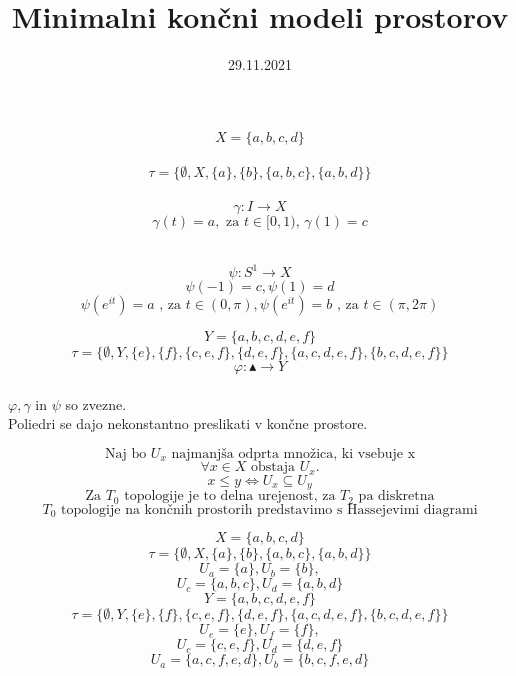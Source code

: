 \documentclass[70]{beamer}
\begin{document}
\title{Minimalni končni modeli prostorov}
\date{29.11.2021}

\begin{frame}
   \titlepage
\end{frame}

\begin{frame}
    $$X = \{a,b,c,d\}$$\\
    $$\tau = \{\emptyset, X, \{a\}, \{b\}, \{a,b,c\}, \{a,b,d\}\}$$ \\ \pause
    $$\gamma : I \rightarrow X$$
    $$  \gamma  (t)  = a, \text{ za }t \in [0,1)\text{, }  \gamma  (1) = c$$\\
    \pause

    $$\psi: S^1 \rightarrow X$$
    $$\psi(-1) = c, \psi(1) = d$$
    $$ \psi(e^{it}) = a\text{ , za } t\in (0,\pi), \psi(e^{it}) = b\text{ , za } t\in (\pi,2\pi)$$


\end{frame}
\begin{frame}
    $$Y = \{a,b,c,d, e, f\}$$
    $$ \tau = \{ \emptyset, Y , \{e\}, \{f\} , \{c,e,f\},\{d,e,f\} ,\{a, c, d, e, f \}, \{b, c, d, e, f\}\}$$
    $$\varphi: \blacktriangle \rightarrow Y$$\\ \pause
    $\varphi ,\gamma$ in $ \psi$ so zvezne. \\ \pause
    Poliedri se dajo nekonstantno preslikati v končne prostore.
\end{frame}

\begin{frame}
    $$\text{Naj bo } U_x \text{ najmanjša odprta množica, ki vsebuje x}$$ \pause
    $$ \forall x \in X \text{ obstaja } U_x. $$ \pause
    $$x \le y \Leftrightarrow U_x \subseteq U_y $$ \pause
    $$\text{Za } T_0 \text{ topologije je to delna urejenost, za $T_2$ pa diskretna}$$ \pause
    $$ T_0 \text{ topologije na končnih prostorih predstavimo s Hassejevimi diagrami}$$
\end{frame}

\begin{frame}
    $$X = \{a,b,c,d\}$$
    $$\tau = \{\emptyset, X, \{a\}, \{b\}, \{a,b,c\}, \{a,b,d\}\}$$
    $$U_a = \{a\}, U_b=\{b\},$$
    $$ U_c = \{a, b, c\}, U_d = \{a, b, d\}$$
    \pause
    $$Y = \{a,b,c,d, e, f\}$$
    $$ \tau = \{ \emptyset, Y , \{e\}, \{f\} , \{c,e,f\},\{d,e,f\} ,\{a, c, d, e, f \}, \{b, c, d, e, f\}\}$$
    $$U_e = \{e\}, U_f=\{f\},$$
    $$U_c = \{c, e, f\}, U_d = \{d, e, f\}$$
    $$U_a = \{a,c,f,e,d\}, U_b=\{b,c,f,e,d\}$$
\end{frame}
\end{document}
